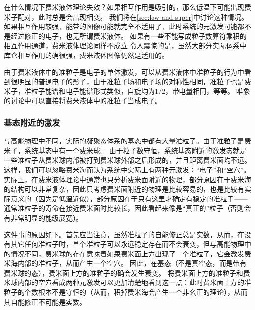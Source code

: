 在什么情况下费米液体理论失效？如果相互作用是吸引的，那么低温下可能出现费米子配对，此时总是会出现相变。
我们将在\autoref{sec:low-and-super}中讨论这种情况。
如果相互作用较强，能带的图像可能就完全不适用了，此时系统的元激发可能都不是经过修正的电子，也无所谓费米液体。
如果有一些不能写成粒子数算符乘积的相互作用通道，费米液体理论同样不成立
令人震惊的是，虽然大部分实际体系中库仑相互作用的确很强，费米液体图像仍然是适用的。

由于费米液体中的准粒子是电子的单体激发，可以从费米液体中准粒子的行为中看到很明显的普通电子的影子，由于准粒子场和电子场的对称性相同，准粒子也是费米子，准粒子能谱和电子能谱形式类似，自旋均为$1/2$，带电量相同，等等。
唯象的讨论中可以直接将费米液体中的准粒子当成电子。

\subsubsection{基态附近的激发}\label{sec:fermi-liquid-ground}

与高能物理中不同，实际的凝聚态体系的基态中都有大量准粒子。由于准粒子是费米子，系统基态中有一个费米球。
由于粒子数守恒，系统基态附近的激发态就是一些准粒子从费米球内部被打到费米球外部之后形成的，并且距离费米面均不远。
这样，我们可以忽略费米海而认为系统中实际上有两种元激发：“电子”和“空穴”。
实际上，在费米液体理论中通常也只分析费米面附近的物理，部分原因在于费米海的结构可以非常复杂，因此只考虑费米面附近的物理是比较容易的，也是比较有实际意义的（因为是低温近似），部分原因在于只有这里才确定有稳定的准粒子——通常准粒子的寿命在接近费米面时比较长，因此看起来像是“真正的”粒子（否则会有非常明显的能级展宽）。

这件事的原因如下。首先应当注意，虽然准粒子的自能修正总是实数，从而，在没有其它任何准粒子时，单个准粒子可以永远稳定存在而不会衰变，但与高能物理中的情况不同，费米球的存在意味着如果费米面上方出现了一个准粒子，它会激发费米海内部的准粒子，从而产生一个空穴。
因此，在基态（不是真空态，而是带有费米球的态），费米面上方的准粒子的确会发生衰变。
将费米面上方的准粒子和费米球内部的空穴看成两种元激发可以更加清楚地看到这一点：此时费米面上方的准粒子的个数根本不是守恒的（从而，积掉费米海会产生一个非幺正的理论），从而其自能修正不可能是实数。

